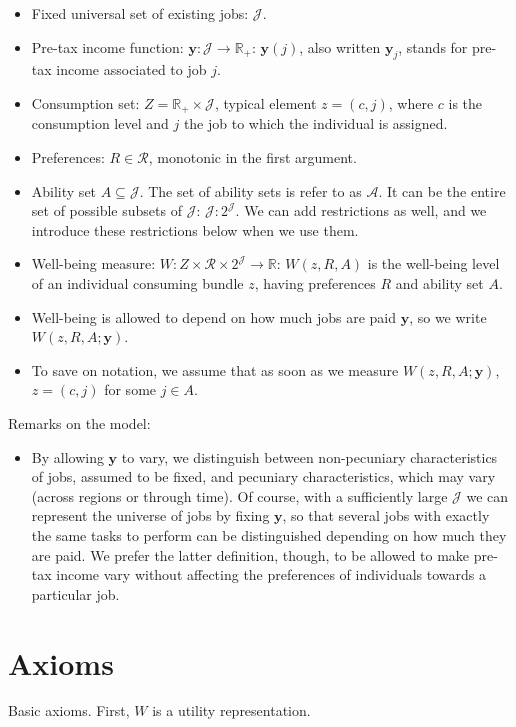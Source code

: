 \documentclass[12pt]{article}
\begin{document}
\begin{itemize}
    \item Fixed universal set of existing jobs: $\mathcal{J}$.
    \item Pre-tax income function: $\mathbf{y}:\mathcal{J}\rightarrow \mathbb{R}_{+}$: $\mathbf{y}(j)$, also written $\mathbf{y}_j$, stands for pre-tax income associated to job $j$. 
    \item Consumption set: $Z=\mathbb{R}_{+}\times \mathcal{J}$, typical element $z=(c,j)$, where $c$ is the consumption level and $j$ the job to which the individual is assigned.
    \item Preferences: $R\in\mathcal{R}$, monotonic in the first argument.
    \item Ability set $A\subseteq \mathcal{J}$. The set of ability sets is refer to as $\mathcal{A}$. It can be the entire set of possible subsets of $\mathcal{J}$: $\mathcal{J}:2^{\mathcal{J}}$. We can add restrictions as well, and we introduce these restrictions below when we use them.
    \item Well-being measure: $W: Z\times \mathcal{R} \times 2^{\mathcal{J}}\rightarrow \mathbb{R}$: $W(z,R,A)$ is the well-being level of an individual consuming bundle $z$, having preferences $R$ and ability set $A$.
    \item Well-being is allowed to depend on how much jobs are paid $\mathbf{y}$, so we write $W(z,R,A;\mathbf{y})$.
    \item To save on notation, we assume that as soon as we measure $W(z,R,A;\mathbf{y})$, $z=(c,j)$ for some $j\in A$.
\end{itemize}
Remarks on the model:
\begin{itemize}
  \item By allowing $\mathbf{y}$ to vary, we distinguish between non-pecuniary characteristics of jobs, assumed to be fixed, and pecuniary characteristics, which may vary (across regions or through time). Of course, with a sufficiently large $\mathcal{J}$ we can represent the universe of jobs by fixing $\mathbf{y}$, so that several jobs with exactly the same tasks to perform can be distinguished depending on how much they are paid. We prefer the latter definition, though, to be allowed to make pre-tax income vary without affecting the preferences of individuals towards a particular job.
\end{itemize}

\section{Axioms}
Basic axioms. First, $W$ is a utility representation.
\end{document}
